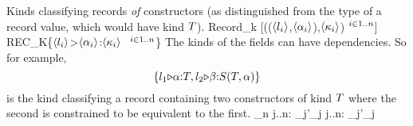 \documentclass[12pt,twoside,fleqn]{article}
\begin{document}
  {Kinds classifying records \textit{of} constructors (as
   distinguished from the type of a record value, which would have kind 
   $T$).}
  {}
  {Record\_k [(($\langle{l_i}\rangle$,$\langle{\alpha_i}\rangle$),$\langle{\kappa_i}\rangle$)$\ {}^{i\in 1..n}$]}
  {REC\_K\{$\langle{l_i}\rangle$>$\langle{\alpha_i}\rangle$:$\langle{\kappa_i}\rangle$
           $\ {}^{i\in 1..n}$\}} 
  {The kinds of the fields can have dependencies.  So for example,
   \[\{{l_1{\triangleright}{\alpha}{:}{T},
              l_2{\triangleright}{\beta}{:}
                  {S(T,\alpha)}}\}\]
   is the kind classifying a record containing two constructors
   of kind $T$ where the second is constrained to be equivalent
   to the first.}
  {
    \irule
    {\validcontext{\context}\quad
                 {\kind_n}}
    {\validkind{\context}
       {}}
    \irule
     {\forall j..n:\quad
                 {\kind_j}{\kind'_j}}
     {\equivkind{\context}
        {}
        {}}
    \irule
     {\forall j..n:\quad
                 {\kind_j}{\kind'_j}}
     {\subkind{\context}
        {}
        {}}
   }

\newcommand{\kpimil}[3]{\Pi^{#1}(#2).#3}
\end{document}

